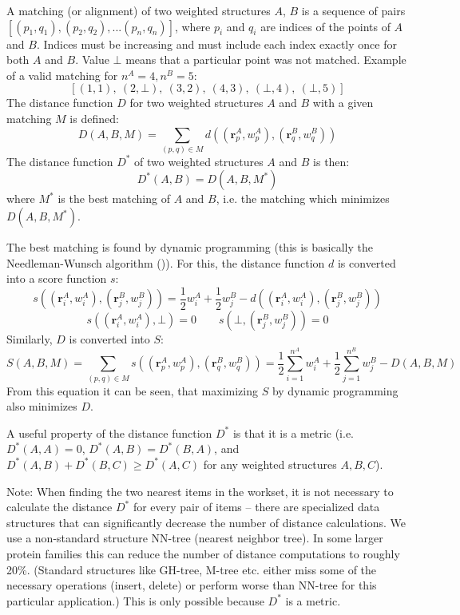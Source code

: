 \documentclass{article}
\begin{document}
A matching (or alignment) of two weighted structures \(A\), \(B\) is a sequence of
pairs \([(p_1, q_1), (p_2, q_2), \allowbreak ...\allowbreak(p_n, q_n)]\), 
where \(p_i\) and \(q_i\) are indices of the points of \(A\) and \(B\).
Indices must be increasing and must include each index exactly once for
both \(A\) and \(B\). Value \(\bot\) means that a particular point was
not matched. Example of a valid matching for \(n^A = 4, n^B = 5\):
  \[  [(1, 1),\ (2, \bot),\ (3, 2),\ (4, 3),\ (\bot, 4),\ (\bot, 5)]  \]
The distance function \(D\) for two weighted structures \(A\) and \(B\) with a given matching \(M\) is defined:
  \[  D(A, B, M) = \sum\limits_{(p, q) \in M}{d \left( (\mathbf{r}^A_{p}, w^A_{p}), (\mathbf{r}^B_{q}, w^B_{q}) \right)}  \]
The distance function \(D^*\) of two weighted structures \(A\) and \(B\) is then:
  \[  D^*(A, B) = D(A, B, M^*)  \]
where \(M^*\) is the best matching of \(A\) and \(B\), i.e. the matching which minimizes \(D(A, B, M^*)\).

The best matching is found by dynamic programming (this is basically
the Needleman-Wunsch algorithm ()). 
For this, the distance  function \(d\) is converted into a score function \(s\):
  \[
    s \left( (\mathbf{r}^A_i, w^A_i), (\mathbf{r}^B_j, w^B_j) \right) 
    = \frac{1}{2} w^A_i + \frac{1}{2} w^B_j - d \left( (\mathbf{r}^A_i, w^A_i), (\mathbf{r}^B_j, w^B_j) \right)
  \]
  \[
    s \left( (\mathbf{r}^A_i, w^A_i), \bot \right) = 0 \qquad 
    s \left( \bot, (\mathbf{r}^B_j, w^B_j) \right) = 0
  \]
Similarly, \(D\) is converted into \(S\):
  \[
    S(A, B, M) 
    = \sum\limits_{(p, q) \in M}{s \left( (\mathbf{r}^A_{p}, w^A_{p}), (\mathbf{r}^B_{q}, w^B_{q}) \right)}
    = \frac{1}{2} \sum\limits_{i=1}^{n^A}{w^A_i} + \frac{1}{2} \sum\limits_{j=1}^{n^B}{w^B_j} - D(A, B, M)
  \]
From this equation it can be seen, that maximizing \(S\) by dynamic
programming also minimizes \(D\).

A useful property of the distance function \(D^*\) is that it is a
metric (i.e.~\(D^*(A,A) = 0\), \(D^*(A,B) = D^*(B,A)\), and
\(D^*(A,B) + D^*(B,C) \geq D^*(A,C)\) for any weighted structures
\(A, B, C\)).

Note: When finding the two nearest items in the workset, it is not
necessary to calculate the distance \(D^*\) for every pair of items --
there are specialized data structures that can significantly decrease
the number of distance calculations. We use a non-standard structure
NN-tree (nearest neighbor tree). In some larger protein families this
can reduce the number of distance computations to roughly 20\%. 
(Standard structures like GH-tree, M-tree etc. either miss some of
the necessary operations (insert, delete) or perform worse than NN-tree
for this particular application.) This is only possible because \(D^*\) 
is a metric.
\end{document}
